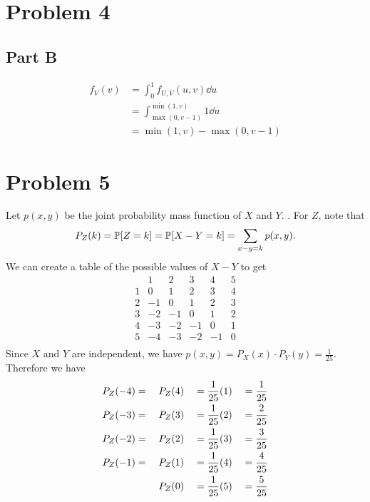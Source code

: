 \documentclass{eeleyes}
\begin{document}
\section*{Problem 4}
\subsection*{Part B}
\begin{align*}
    f_V(v) &= \int_0^1 f_{U,V}(u,v) \dd u \\
           &= \int_{\max(0,v-1)}^{\min(1,v)} 1 \dd u \\
           &= \min(1,v) - \max(0, v-1)
\end{align*}

\section*{Problem 5}
Let $p(x,y)$ be the joint probability mass function of $X$ and $Y$. . For $Z$, note that
\[
    P_Z(k) = \mathbb{P}\qty[Z = k] = \mathbb{P}\qty[X - Y = k] = \sum_{x - y = k} p(x,y)
.\]
We can create a table of the possible values of $X - Y$ to get
\[
    \begin{array}{c||c|c|c|c|c}
          & 1  & 2  & 3  &  4 & 5  \\\hline\hline
        1 &  0 &  1 &  2 &  3 &  4 \\\hline
        2 & -1 &  0 &  1 &  2 &  3 \\\hline
        3 & -2 & -1 &  0 &  1 &  2 \\\hline
        4 & -3 & -2 & -1 &  0 &  1 \\\hline
        5 & -4 & -3 & -2 & -1 &  0 \\
    \end{array}
\]
Since $X$ and $Y$ are independent, we have $p(x,y) = P_X(x) \cdot P_Y(y) = \frac{1}{25}$. Therefore we have
\begin{alignat*}{7}
    P_Z(-4) &=\;&& P_Z(4) &&= \frac{1}{25}\qty(1) &&= \frac{1}{25} \\
    P_Z(-3) &=&& P_Z(3) &&= \frac{1}{25}\qty(2) &&= \frac{2}{25} \\
    P_Z(-2) &=&& P_Z(2) &&= \frac{1}{25}\qty(3) &&= \frac{3}{25} \\
    P_Z(-1) &=&& P_Z(1) &&= \frac{1}{25}\qty(4) &&= \frac{4}{25} \\
            & && P_Z(0) &&= \frac{1}{25}\qty(5) &&= \frac{5}{25}
\end{alignat*}
\end{document}
